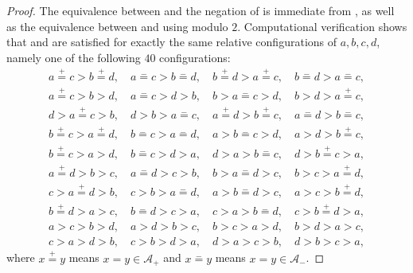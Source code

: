 \begin{proof}
    The equivalence between  and the negation of  is immediate from , as well as the equivalence between  and  using modulo \(2\).
    Computational verification shows that  and 
    are satisfied for exactly the same relative configurations of \(a, b, c, d\), namely one of the following \(40\) configurations:
    \allowdisplaybreaks
    \begin{gather*}
    a \overset{+}{=} c > b \overset{+}{=} d, \quad
    a \overset{-}{=} c > b \overset{-}{=} d, \quad
    b \overset{+}{=} d > a \overset{+}{=} c, \quad
    b \overset{-}{=} d > a \overset{-}{=} c, \\[4pt]
    a \overset{+}{=} c > b > d, \quad
    a \overset{-}{=} c > d > b, \quad
    b > a \overset{-}{=} c > d, \quad
    b > d > a \overset{+}{=} c, \\[4pt]
    d > a \overset{+}{=} c > b, \quad
    d > b > a \overset{-}{=} c, \quad
    a \overset{+}{=} d > b \overset{+}{=} c, \quad
    a \overset{-}{=} d > b \overset{-}{=} c, \\[4pt]
    b \overset{+}{=} c > a \overset{+}{=} d, \quad
    b \overset{-}{=} c > a \overset{-}{=} d, \quad
    a > b \overset{-}{=} c > d, \quad
    a > d > b \overset{+}{=} c, \\[4pt]
    b \overset{+}{=} c > a > d, \quad
    b \overset{-}{=} c > d > a, \quad
    d > a > b \overset{-}{=} c, \quad
    d > b \overset{+}{=} c > a, \\[4pt]
    a \overset{+}{=} d > b > c, \quad
    a \overset{-}{=} d > c > b, \quad
    b > a \overset{-}{=} d > c, \quad
    b > c > a \overset{+}{=} d, \\[4pt]
    c > a \overset{+}{=} d > b, \quad
    c > b > a \overset{-}{=} d, \quad
    a > b \overset{-}{=} d > c, \quad
    a > c > b \overset{+}{=} d, \\[4pt]
    b \overset{+}{=} d > a > c, \quad
    b \overset{-}{=} d > c > a, \quad
    c > a > b \overset{-}{=} d, \quad
    c > b \overset{+}{=} d > a, \\[4pt]
    a > c > b > d, \quad
    a > d > b > c, \quad
    b > c > a > d, \quad
    b > d > a > c, \\[4pt]
    c > a > d > b, \quad
    c > b > d > a, \quad
    d > a > c > b, \quad
    d > b > c > a,
    \end{gather*}
    where \(x \overset{+}{=} y\) means \(x = y \in \mathcal{A}_+\) and \(x \overset{-}{=} y\) means \(x = y \in \mathcal{A}_-\).
\end{proof}

